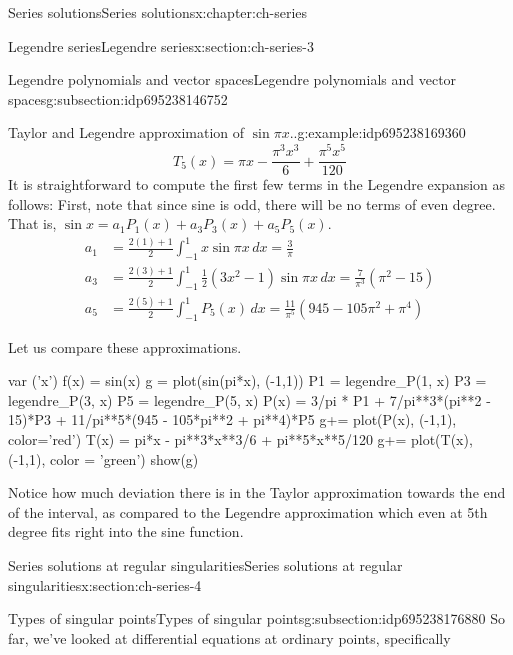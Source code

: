 \documentclass[oneside,10pt,]{book}
\numberwithin{equation}{section}
\numberwithin{equation}{section}
\newcommand{\amp}{&}
\begin{document}
\begin{chapterptx}{Series solutions}{}{Series solutions}{}{}{x:chapter:ch-series}
\begin{sectionptx}{Legendre series}{}{Legendre series}{}{}{x:section:ch-series-3}
\begin{subsectionptx}{Legendre polynomials and vector spaces}{}{Legendre polynomials and vector spaces}{}{}{g:subsection:idp695238146752}
\begin{example}{Taylor and Legendre approximation of \(\sin \pi x\)..}{g:example:idp695238169360}
\begin{equation*}
T_5(x) = \pi x - \frac{\pi^3 x^3}{6} + \frac{\pi^5 x^5}{120}
\end{equation*}
It is straightforward to compute the first few terms in the Legendre expansion as follows: First, note that since sine is odd, there will be no terms of even degree. That is, \(\sin x = a_1 P_1(x) + a_3 P_3(x) + a_5 P_5(x)\).%
\begin{align*}
a_1 \amp= \frac{2(1) + 1}{2} \int_{-1}^1 x \sin \pi x\, dx = \frac{3}{\pi}\\
a_3 \amp= \frac{2(3) + 1}{2} \int_{-1}^1 \frac{1}{2}(3x^2 - 1) \sin\pi x \, dx = \frac{7}{\pi^3}(\pi^2 - 15)\\
a_5 \amp= \frac{2(5) + 1}{2} \int_{-1}^1 P_5(x) \, dx = \frac{11}{\pi^5} (945 - 105\pi^2 + \pi^4)
\end{align*}
%
\par
Let us compare these approximations.%
\begin{sageinput}
var ('x')
f(x) = sin(x)
g = plot(sin(pi*x), (-1,1))
P1 = legendre_P(1, x)
P3 = legendre_P(3, x)
P5 = legendre_P(5, x)
P(x) = 3/pi * P1 + 7/pi**3*(pi**2 - 15)*P3 + 11/pi**5*(945 - 105*pi**2 + pi**4)*P5
g+= plot(P(x), (-1,1), color='red')
T(x) = pi*x - pi**3*x**3/6 + pi**5*x**5/120
g+= plot(T(x), (-1,1), color = 'green')
show(g)
\end{sageinput}
Notice how much deviation there is in the Taylor approximation towards the end of the interval, as compared to the Legendre approximation which even at 5th degree fits right into the sine function.%
\end{example}
\end{subsectionptx}
\end{sectionptx}
%
%
\typeout{************************************************}
\typeout{************************************************}
%
\begin{sectionptx}{Series solutions at regular singularities}{}{Series solutions at regular singularities}{}{}{x:section:ch-series-4}
%
%
\typeout{************************************************}
\typeout{************************************************}
%
\begin{subsectionptx}{Types of singular points}{}{Types of singular points}{}{}{g:subsection:idp695238176880}
So far, we've looked at differential equations at ordinary points, specifically%
\begin{equation*}

\end{equation*}
\end{subsectionptx}
\end{sectionptx}
\end{chapterptx}
\end{document}
